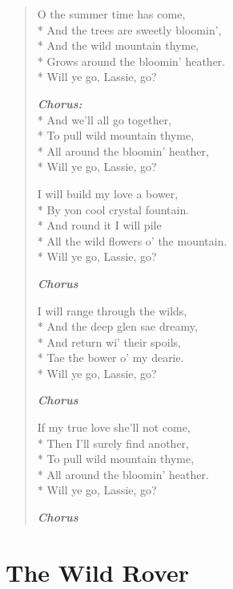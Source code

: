 \documentclass[9pt,twoside]{extarticle}
\newenvironment{xverse}{
	\begin{verse}
	\fontsize{8.5}{10.5}\selectfont
	}
	{
	\end{verse}
	\penalty 0
}
\newcommand{\chorusdef}{\textbf{\emph{Chorus:}}\\*}
\newcommand{\chorusmark}[1][1]{%
\vspace{-0.5\stanzaskip}%
\textbf{\emph{Chorus \ifthenelse{\equal{#1}{1}}{}{$\times$ #1}}}%
\vspace{-0.5\stanzaskip}%
}
\begin{document}
\begin{xverse}
O the summer time has come, \\*
And the trees are sweetly bloomin’, \\*
And the wild mountain thyme, \\*
Grows around the bloomin’ heather. \\*
Will ye go, Lassie, go?

\chorusdef
And we’ll all go together, \\*
To pull wild mountain thyme, \\*
All around the bloomin’ heather, \\*
Will ye go, Lassie, go?

I will build my love a bower, \\*
By yon cool crystal fountain. \\*
And round it I will pile \\*
All the wild flowers o’ the mountain. \\*
Will ye go, Lassie, go?

\chorusmark

I will range through the wilds, \\*
And the deep glen sae dreamy, \\*
And return wi’ their spoils, \\*
Tae the bower o’ my dearie. \\*
Will ye go, Lassie, go?

\chorusmark

If my true love she’ll not come, \\*
Then I’ll surely find another, \\*
To pull wild mountain thyme, \\*
All around the bloomin’ heather. \\*
Will ye go, Lassie, go?

\chorusmark
\end{xverse}

\section{The Wild Rover}
\end{document}
